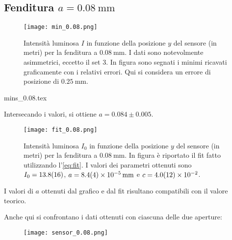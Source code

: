 \documentclass[../main.tex]{subfiles}
\begin{document}
\subsection{Fenditura $a = \qty{0.08}{\milli\metre}$}

\begin{figure}[ht!]
    \centering
    \texttt{[image: min\_0.08.png]}
    \caption{Intensità luminosa $I$ in funzione della posizione $y$ del sensore (in metri) per la fenditura a $\qty{0.08}{\mm}$. I dati sono notevolmente asimmetrici, eccetto il set 3. In figura sono segnati i minimi ricavati graficamente con i relativi errori. Qui si considera un errore di posizione di $\qty{0.25}{\mm}$.} %
    \label{fig:minimi 0.08}
\end{figure}

\begin{table}[ht!]
    \centering
    \caption{}
    {mins_0.08.tex}
    \label{tab:minimi 0.08}
\end{table}

Intersecando i valori, si ottiene $a = 0.084 \pm 0.005$.

\begin{figure}[ht!]
    \centering
    \texttt{[image: fit\_0.08.png]}
    \caption{Intensità luminosa $I_{0}$ in funzione della posizione $y$ del sensore (in metri) per la fenditura a $\qty{0.08}{\mm}$. In figura è riportato il fit fatto utilizzando l'\autoref{eq:fit}. I valori dei parametri ottenuti sono $I_{0} = \num{13.8+-1.6}$, $a = \qty{8.4+-0.4e-5}{\mm}$ e $c = \num{4+-1.2e-2}$.}
    \label{fig:fit 0.08}
\end{figure}

I valori di $a$ ottenuti dal grafico e dal fit risultano compatibili con il valore teorico.

Anche qui si confrontano i dati ottenuti con ciascuna delle due aperture:

\begin{figure}[ht!]
    \centering
    \texttt{[image: sensor\_0.08.png]}
    \caption{}
    \label{fig:sensore 0.08}
\end{figure}
\end{document}
